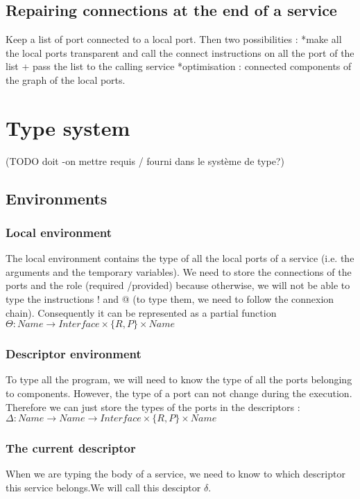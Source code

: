 \section{Repairing connections at the end of a service}
Keep a list of port connected to a local port. Then two possibilities : 
*make all the local ports transparent and call the connect instructions on all the port of the list + pass the list to the calling service
*optimisation : connected components of the graph of the local ports.




\chapter{Type system}
(TODO doit -on mettre requis / fourni dans le système de type?)
\section{Environments}
\subsection{Local environment}
The local environment contains the type of all the local ports of a service (i.e. the arguments and the temporary variables). We need to store the connections of the ports and the role (required /provided) because otherwise, we will not be able to type the instructions ! and @ (to type them, we need to follow the connexion chain).  Consequently it can be represented as a partial function $\Theta : Name \rightarrow Interface \times \{R,P\} \times Name$

\subsection{Descriptor environment}
To type all the program, we will need to know the type of all the ports belonging to components. However, the type of a port can not change during the execution. Therefore we can just store the types of the ports in the descriptors : $\Delta:Name \rightarrow Name\rightarrow Interface \times \{R,P\} \times Name$

\subsection{The current descriptor}
When we are typing the body of a service, we need to know to which descriptor this service belongs.We will call this desciptor $\delta$.

